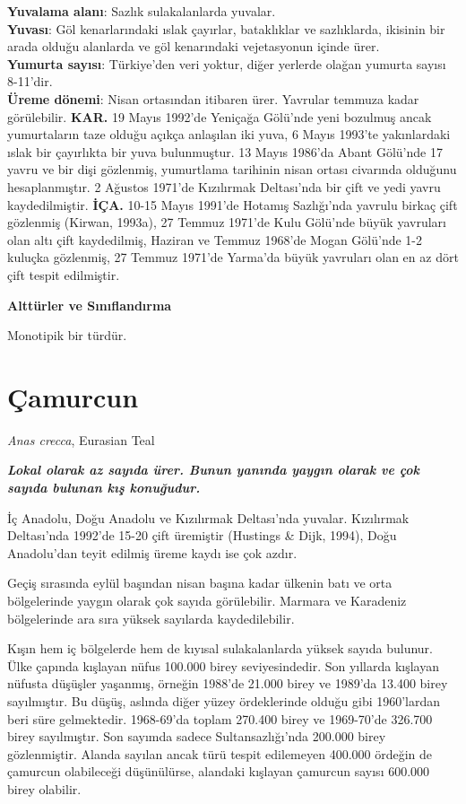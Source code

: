 \documentclass[
  a4paper,
  DIV=11,
  numbers=noendperiod]{scrreprt}
\begin{document}
\textbf{Yuvalama alanı}: Sazlık sulakalanlarda yuvalar.\\
\textbf{Yuvası}: Göl kenarlarındaki ıslak çayırlar, bataklıklar ve
sazlıklarda, ikisinin bir arada olduğu alanlarda ve göl kenarındaki
vejetasyonun içinde ürer.\\
\textbf{Yumurta sayısı}: Türkiye'den veri yoktur, diğer yerlerde olağan
yumurta sayısı 8-11'dir.\\
\textbf{Üreme dönemi}: Nisan ortasından itibaren ürer. Yavrular temmuza
kadar görülebilir. \textbf{KAR.} 19 Mayıs 1992'de Yeniçağa Gölü'nde yeni
bozulmuş ancak yumurtaların taze olduğu açıkça anlaşılan iki yuva, 6
Mayıs 1993'te yakınlardaki ıslak bir çayırlıkta bir yuva bulunmuştur. 13
Mayıs 1986'da Abant Gölü'nde 17 yavru ve bir dişi gözlenmiş, yumurtlama
tarihinin nisan ortası civarında olduğunu hesaplanmıştır. 2 Ağustos
1971'de Kızılırmak Deltası'nda bir çift ve yedi yavru kaydedilmiştir.
\textbf{İÇA.} 10-15 Mayıs 1991'de Hotamış Sazlığı'nda yavrulu birkaç
çift gözlenmiş (Kirwan, 1993a), 27 Temmuz 1971'de Kulu Gölü'nde büyük
yavruları olan altı çift kaydedilmiş, Haziran ve Temmuz 1968'de Mogan
Gölü'nde 1-2 kuluçka gözlenmiş, 27 Temmuz 1971'de Yarma'da büyük
yavruları olan en az dört çift tespit edilmiştir.

\textbf{Alttürler ve Sınıflandırma}

Monotipik bir türdür.

\section{Çamurcun}\label{uxe7amurcun}

\emph{Anas crecca}, Eurasian Teal

\textbf{\emph{Lokal olarak az sayıda ürer. Bunun yanında yaygın olarak
ve çok sayıda bulunan kış konuğudur.}}

İç Anadolu, Doğu Anadolu ve Kızılırmak Deltası'nda yuvalar. Kızılırmak
Deltası'nda 1992'de 15-20 çift üremiştir (Hustings \& Dijk, 1994), Doğu
Anadolu'dan teyit edilmiş üreme kaydı ise çok azdır.

Geçiş sırasında eylül başından nisan başına kadar ülkenin batı ve orta
bölgelerinde yaygın olarak çok sayıda görülebilir. Marmara ve Karadeniz
bölgelerinde ara sıra yüksek sayılarda kaydedilebilir.

Kışın hem iç bölgelerde hem de kıyısal sulakalanlarda yüksek sayıda
bulunur. Ülke çapında kışlayan nüfus 100.000 birey seviyesindedir. Son
yıllarda kışlayan nüfusta düşüşler yaşanmış, örneğin 1988'de 21.000
birey ve 1989'da 13.400 birey sayılmıştır. Bu düşüş, aslında diğer yüzey
ördeklerinde olduğu gibi 1960'lardan beri süre gelmektedir. 1968-69'da
toplam 270.400 birey ve 1969-70'de 326.700 birey sayılmıştır. Son
sayımda sadece Sultansazlığı'nda 200.000 birey gözlenmiştir. Alanda
sayılan ancak türü tespit edilemeyen 400.000 ördeğin de çamurcun
olabileceği düşünülürse, alandaki kışlayan çamurcun sayısı 600.000 birey
olabilir.
\end{document}
